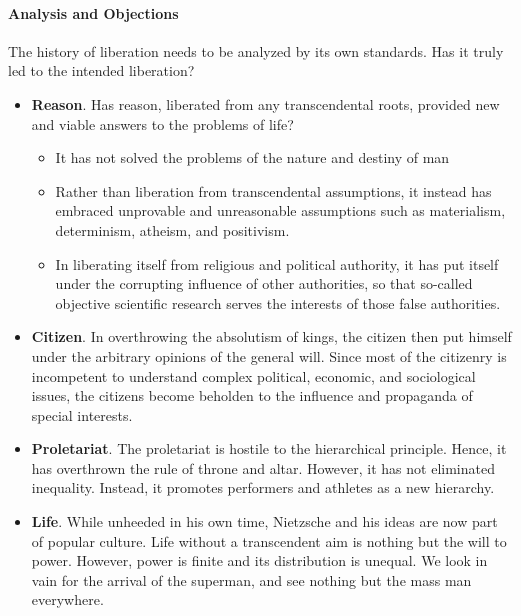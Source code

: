 \paragraph{Analysis and Objections}


The history of liberation needs to be analyzed by its own standards. Has it truly led to the intended liberation?

\begin{itemize}


\item \textbf{Reason}. Has reason, liberated from any transcendental roots, provided new and viable answers to the problems of life?

  \begin{itemize}

  
\item It has not solved the problems of the nature and destiny of man
  
\item Rather than liberation from transcendental assumptions, it instead has embraced unprovable and unreasonable assumptions such as materialism, determinism, atheism, and positivism.
  
\item In liberating itself from religious and political authority, it has put itself under the corrupting influence of other authorities, so that so-called objective scientific research serves the interests of those false authorities.
  \end{itemize}


\item \textbf{Citizen}. In overthrowing the absolutism of kings, the citizen then put himself under the arbitrary opinions of the general will. Since most of the citizenry is incompetent to understand complex political, economic, and sociological issues, the citizens become beholden to the influence and propaganda of special interests.

\item \textbf{Proletariat}. The proletariat is hostile to the hierarchical principle. Hence, it has overthrown the rule of throne and altar. However, it has not eliminated inequality. Instead, it promotes performers and athletes as a new hierarchy.

\item \textbf{Life}. While unheeded in his own time, Nietzsche and his ideas are now part of popular culture. Life without a transcendent aim is nothing but the will to power. However, power is finite and its distribution is unequal. We look in vain for the arrival of the superman, and see nothing but the mass man everywhere.


\end{itemize}
